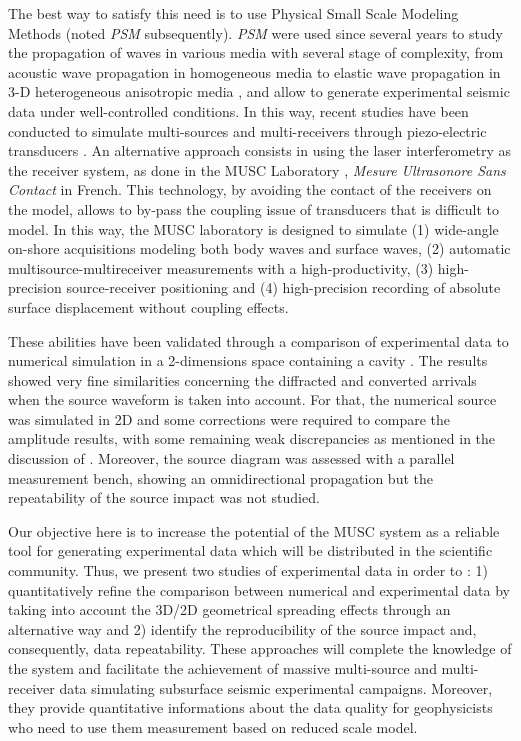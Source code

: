 \documentclass[manuscript,revised]{geophysics}
\newcommand{\psm}{\textit{PSM} }
\newcommand{\thrd}{3-D }
\begin{document}
\noindent The best way to satisfy this need is to use Physical Small Scale Modeling Methods (noted \psm subsequently). \psm were used since several years to study the propagation of waves in various media with several stage of complexity, from acoustic wave propagation in homogeneous media to elastic wave propagation in \thrd heterogeneous anisotropic media \citep{Rieber_EWP_1936,Howes_SMS_1953,Hilterman_TDM_1970,French_MRP_1974,Bishop_LVM_1985,Pratt_FWI_1999,Favretto_NMT_2013,Sarkar_TPM_2003,Isaac_SMS_1999}, and allow to generate experimental seismic data under well-controlled conditions. In this way, recent studies have been conducted to simulate multi-sources and multi-receivers through piezo-electric transducers \citep{Wong_SPM_2009}. An alternative approach consists in using the laser interferometry as the receiver system, as done in the MUSC Laboratory \citep{Bretaudeau_SSA_2008b,Bretaudeau_SSM_2011,Bretaudeau_FWI_2013}, \textit{Mesure Ultrasonore Sans Contact} in French. This technology, by avoiding the contact of the receivers on the model, allows to by-pass the coupling issue of transducers that is difficult to model. In this way, the MUSC laboratory is designed to simulate (1) wide-angle on-shore acquisitions modeling both body waves and surface waves, (2) automatic multisource-multireceiver measurements with a high-productivity, (3) high-precision source-receiver positioning and (4) high-precision recording of absolute surface displacement without coupling effects. 

\noindent These abilities have been validated through a comparison of experimental data to numerical simulation in a 2-dimensions space containing a cavity \citep{Bretaudeau_SSM_2011}. The results showed very fine similarities concerning the diffracted and converted arrivals when the source waveform is taken into account. For that, the numerical source was simulated in 2D and some corrections were required to compare the amplitude results, with some remaining weak discrepancies as mentioned in the discussion of \citet{Bretaudeau_SSM_2011}. Moreover, the source diagram was assessed with a parallel measurement bench, showing an omnidirectional propagation but the repeatability of the source impact was not studied.

\noindent Our objective here is to increase the potential of the MUSC system as a reliable tool for generating experimental data which will be distributed in the scientific community. 
\noindent Thus, we present two studies of experimental data in order to : 1) quantitatively refine the comparison between numerical and experimental data by taking into account the 3D/2D geometrical spreading effects through an alternative way and 2) identify the reproducibility of the source impact and, consequently, data repeatability. These approaches will complete the knowledge of the system and facilitate the achievement of massive multi-source and multi-receiver data simulating subsurface seismic experimental campaigns. Moreover, they provide quantitative informations about the data quality for geophysicists who need to use them measurement based on reduced scale model. 
\end{document}
